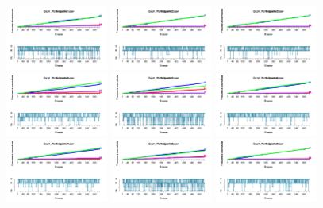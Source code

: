 \documentclass[a4paper ]{article}
\begin{document}
\begin{figure}[th]
\centering
\includegraphics[width=0.3\textwidth]{Figures/Outcome_Exp1_P1} \includegraphics[width=0.3\textwidth]{Figures/Outcome_Exp1_P2} \includegraphics[width=0.3\textwidth]{Figures/Outcome_Exp1_P3}
\includegraphics[width=0.3\textwidth]{Figures/Outcome_Exp1_P4} \includegraphics[width=0.3\textwidth]{Figures/Outcome_Exp1_P5} \includegraphics[width=0.3\textwidth]{Figures/Outcome_Exp1_P6}
\includegraphics[width=0.3\textwidth]{Figures/Outcome_Exp1_P7} \includegraphics[width=0.3\textwidth]{Figures/Outcome_Exp1_P8} \includegraphics[width=0.3\textwidth]{Figures/Outcome_Exp1_P9}

\end{figure}
\end{document}
